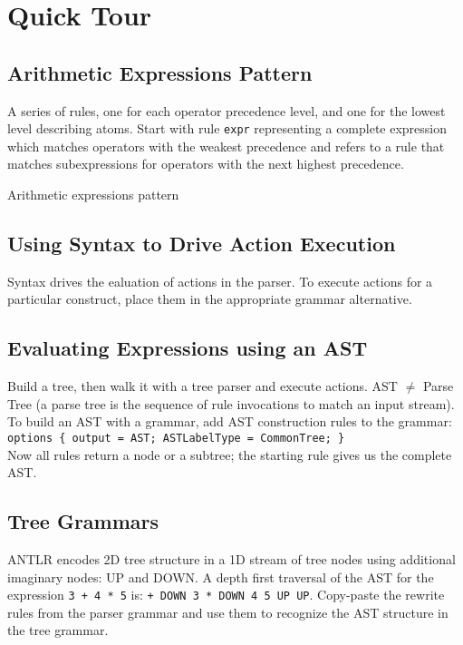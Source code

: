 \section{Quick Tour}

\subsection{Arithmetic Expressions Pattern}

A series of rules, one for each operator precedence level,
and one for the lowest level describing atoms.
Start with rule \verb=expr= representing a complete expression
which matches operators with the weakest precedence
and refers to a rule that matches subexpressions
for operators with the next highest precedence.

\begin{program}
\caption{Arithmetic expressions pattern\label{tour:arithm-expr-pattern}}
\end{program}


\subsection{Using Syntax to Drive Action Execution}
Syntax drives the ealuation of actions in the parser.
To execute actions for a particular construct,
place them in the appropriate grammar alternative.


\subsection{Evaluating Expressions using an AST}

Build a tree, then walk it with a tree parser and execute actions.
AST $\neq$ Parse Tree
(a parse tree is the sequence of rule invocations to match an input stream).
To build an AST with a grammar, add AST construction rules to the grammar:\\
\verb!options { output = AST; ASTLabelType = CommonTree; }!\\
Now all rules return a node or a subtree;
the starting rule gives us the complete AST.


\subsection{Tree Grammars}

ANTLR encodes 2D tree structure in a 1D stream of tree nodes
using additional imaginary nodes: UP and DOWN.
A depth first traversal of the AST for the expression \verb=3 + 4 * 5= is:
\verb=+ DOWN 3 * DOWN 4 5 UP UP=.
Copy-paste the rewrite rules from the parser grammar
and use them to recognize the AST structure in the tree grammar.

